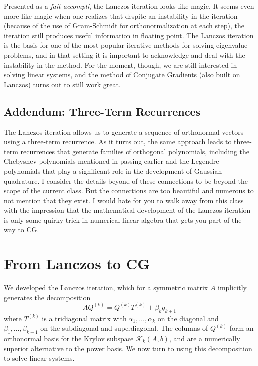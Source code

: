 \documentclass[12pt, leqno]{article}
\newcommand{\calK}{\mathcal{K}}
\begin{document}
Presented as a {\em fait accompli}, the Lanczos iteration looks like
magic.  It seems even more like magic when one realizes that despite
an instability in the iteration (because of the use of Gram-Schmidt
for orthonormalization at each step), the iteration still produces
useful information in floating point.  The Lanczos iteration is the
basis for one of the most popular iterative methods for solving
eigenvalue problems, and in that setting it is important to
acknowledge and deal with the instability in the method.  For the
moment, though, we are still interested in solving linear systems,
and the method of Conjugate Gradients (also built on Lanczos)
turns out to still work great.

\subsection{Addendum: Three-Term Recurrences}

The Lanczos iteration allows us to generate a sequence of orthonormal
vectors using a three-term recurrence.  As it turns out, the same
approach leads to three-term recurrences that generate families of
orthogonal polynomials, including the Chebyshev polynomials mentioned
in passing earlier and the Legendre polynomials that play
a significant role in the development of Gaussian quadrature.  I
consider the details beyond of these connections to be beyond the
scope of the current class.  But the connections are too beautiful and
numerous to not mention that they exist.  I would hate for you to walk
away from this class with the impression that the mathematical
development of the Lanczos iteration is only some quirky trick in
numerical linear algebra that gets you part of the way to CG.

\section{From Lanczos to CG}

We developed the Lanczos iteration, which for a symmetric matrix $A$
implicitly generates the decomposition
\[
  A Q^{(k)} = Q^{(k)} T^{(k)} + \beta_k q_{k+1}
\]
where $T^{(k)}$ is a tridiagonal matrix with $\alpha_1, \ldots,
\alpha_k$ on the diagonal and $\beta_1, \ldots, \beta_{k-1}$ on
the subdiagonal and superdiagonal.  The columns of $Q^{(k)}$ form
an orthonormal basis for the Krylov subspace $\calK_{k}(A,b)$,
and are a numerically superior alternative to the power basis.
We now turn to using this decomposition to solve linear systems.
\end{document}
